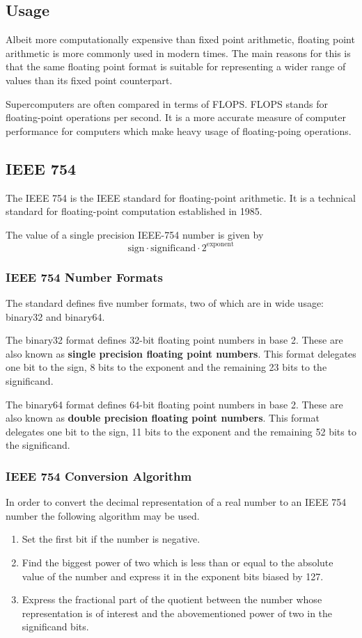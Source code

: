 \documentclass[oneside]{book}
\begin{document}
\subsection{Usage}
Albeit more computationally expensive than fixed point arithmetic, floating
point arithmetic is more commonly used in modern times. The main reasons for
this is that the same floating point format is suitable for representing a wider
range of values than its fixed point counterpart.

Supercomputers are often compared in terms of FLOPS. FLOPS stands for
floating-point operations per second. It is a more accurate measure of computer
performance for computers which make heavy usage of floating-poing
operations.

\subsection{IEEE 754}
The IEEE 754 is the IEEE standard for floating-point arithmetic. It is a
technical standard for floating-point computation established in 1985.

The value of a single precision IEEE-754 number is given by
\[\text{sign} \cdot \text{significand} \cdot 2^\text{exponent}\]

\subsubsection{IEEE 754 Number Formats}
The standard defines five number formats, two of which are in wide usage:
binary32 and binary64.

The binary32 format defines 32-bit floating point numbers in base 2. These are
also known as \textbf{single precision floating point numbers}. This format
delegates one bit to the sign, 8 bits to the exponent and the remaining 23 bits
to the significand.

The binary64 format defines 64-bit floating point numbers in base 2. These are
also known as \textbf{double precision floating point numbers}. This format
delegates one bit to the sign, 11 bits to the exponent and the remaining 52 bits
to the significand.

\subsubsection{IEEE 754 Conversion Algorithm}
In order to convert the decimal representation of a real number to an IEEE 754
number the following algorithm may be used.
\begin{enumerate}
\item Set the first bit if the number is negative.
\item Find the biggest power of two which is less than or equal to the absolute
    value of the number and express it in the exponent bits biased by 127.
\item Express the fractional part of the quotient between the number whose
    representation is of interest and the abovementioned power of two in the
    significand bits.
\end{enumerate}
\end{document}

